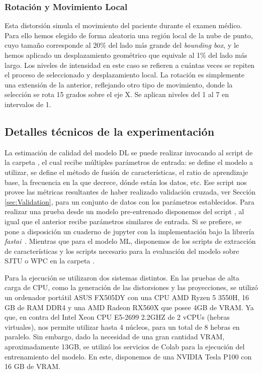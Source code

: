 \subsubsection*{Rotación y Movimiento Local}
Esta distorsión simula el movimiento del paciente durante el examen médico. 
Para ello hemos elegido de forma aleatoria una región local de la nube de punto, 
cuyo tamaño corresponde al 20\% del lado más grande del \emph{bounding box}, y 
le hemos aplicado un desplazamiento geométrico que equivale al 1\% del lado 
más largo. Los niveles de intensidad en este caso se refieren a cuántas veces 
se repiten el proceso de seleccionado y desplazamiento local. 
La rotación es simplemente una extensión de la anterior, reflejando otro tipo de movimiento, 
donde la selección se rota 15 grados sobre el eje X. Se aplican niveles del 1 al 7 en intervalos de 1.
\subsection*{Detalles técnicos de la experimentación} 
\label{sec:TrainML}
La estimación de calidad del modelo DL se puede realizar invocando al script  de la carpeta ,
el cual recibe múltiples parámetros de entrada: se define el modelo a utilizar, 
se define el método de fusión de características, el ratio de aprendizaje base,
la frecuencia en la que decrece, dónde están los datos, etc. Ese script nos 
provee las métricas resultantes de haber realizado validación cruzada, 
ver Sección \ref{sec:Validation}, 
para un conjunto de datos con los parámetros establecidos. 
Para realizar una prueba desde un modelo pre-entrenado disponemos del script 
, al igual que el anterior recibe parámetros similares de entrada.
Si se prefiere, se pone a disposición un cuaderno de jupyter con la implementación 
bajo la librería \emph{fastai}~\cite{fastai}.
Mientras que para el modelo ML, disponemos de los scripts de extracción 
de características y los scripts necesario para la evaluación del 
modelo sobre SJTU\cite{SJTU} o WPC\cite{WPC1, WPC2} en la carpeta .

Para la ejecución se utilizaron dos sistemas distintos. En las pruebas de alta 
carga de CPU, como la generación de las distorsiones y las proyecciones, 
se utilizó un ordenador portátil ASUS FX505DY con una CPU AMD Ryzen 5 
3550H, 16 GB de RAM DDR4 y una AMD Radeon RX560X que posee 4GB de VRAM. Ya 
que, en contra del Intel Xeon CPU E5-2699 2.2GHZ de 2 vCPUs (hebras virtuales), 
nos permite utilizar hasta 4 núcleos, para un total de 8 hebras en paralelo. 
Sin embargo, dado la necesidad de una gran cantidad VRAM, aproximadamente 13GB, 
se utilizó los servicios de Colab para la ejecución del entrenamiento del modelo. 
En este, disponemos de una NVIDIA Tesla P100 con 16 GB de VRAM.  

